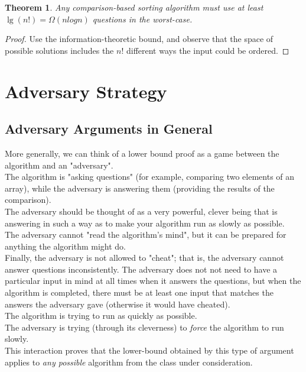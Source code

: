 \documentclass[12pt]{article}
\theoremstyle{plain}
\newtheorem{theorem}{Theorem}[subsection]
\theoremstyle{definition}
\begin{document}
\begin{theorem}
Any comparison-based sorting algorithm must use at least $\lg(n!) = \Omega(n log n)$ questions in the worst-case.
\end{theorem}
\begin{proof}
Use the information-theoretic bound, and observe that the space of possible solutions includes the $n!$ different ways the input could be ordered.
\end{proof}

\newpage
\section{Adversary Strategy}
\subsection{Adversary Arguments in General}
More generally, we can think of a lower bound proof as a game between the algorithm and an "adversary". \\
The algorithm is "asking questions" (for example, comparing two elements of an array), while the adversary is answering them (providing the results of the comparison). \\

The adversary should be thought of as a very powerful, clever being that is answering in such a way as to make your algorithm run as slowly as possible. \\
The adversary cannot "read the algorithm's mind", but it can be prepared for anything the algorithm might do. \\
Finally, the adversary is not allowed to "cheat";
that is, the adversary cannot answer questions inconsistently.
The adversary does not not need to have a particular input in mind at all times when it answers the questions, but when the algorithm is completed, there must be at least one input that matches the answers the adversary gave (otherwise it would have cheated). \\

The algorithm is trying to run as quickly as possible. \\
The adversary is trying (through its cleverness) to \emph{force} the algorithm to run slowly. \\
This interaction proves that the lower-bound obtained by this type of argument applies to \emph{any possible} algorithm from the class under consideration. \\
\end{document}
